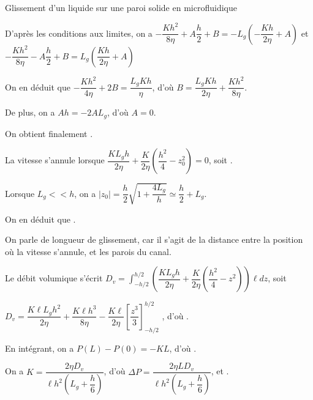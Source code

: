 \begin{exo}[PC][1][devoir]{Glissement d'un liquide sur une paroi solide en microfluidique}
\begin{quest}
{  D'après les conditions aux limites, on a $-\dfrac{Kh^2}{8\eta}+A\dfrac{h}{2}+B=-L_g\left(-\dfrac{Kh}{2\eta}+A\right)$ et $-\dfrac{Kh^2}{8\eta}-A\dfrac{h}{2}+B=L_g\left(\dfrac{Kh}{2\eta}+A\right)$

On en déduit que $-\dfrac{Kh^2}{4\eta}+2B=\dfrac{L_gKh}{\eta}$, d'où $B=\dfrac{L_gKh}{2\eta}+\dfrac{Kh^2}{8\eta}$.

De plus, on a $Ah=-2AL_g$, d'où $A=0$.

On obtient finalement 
.

}

{
  La vitesse s'annule lorsque $\dfrac{KL_gh}{2\eta}+\dfrac{K}{2\eta}\left(\dfrac{h^2}{4}-z_0^2\right)=0$, soit .

Lorsque $L_g<<h$, on a $\vert z_0 \vert =\dfrac{h}{2}\sqrt{1+\dfrac{4L_g}{h}}\simeq \dfrac{h}{2}+L_g$.

On en déduit que 
.

On parle de longueur de glissement, car il s'agit de la distance entre la position où la vitesse s'annule, et les parois du canal.
}

{
  Le débit volumique s'écrit $D_v=\displaystyle\int_{-h/2}^{h/2}\left(\dfrac{KL_gh}{2\eta}+\dfrac{K}{2\eta}\left(\dfrac{h^2}{4}-z^2\right)\right)\ell dz$, soit 

$D_v=\dfrac{K\ell L_gh^2}{2\eta}+\dfrac{K\ell h^3}{8\eta}-\dfrac{K\ell}{2\eta}\left[\dfrac{z^3}{3}\right]_{-h/2}^{h/2}$ , d'où .
}

{
  En intégrant, on a $P(L)-P(0)=-KL$, d'où .
}

{
  On a $K=\dfrac{2\eta D_v}{\ell h^2\left(L_g+\dfrac{h}{6}\right)}$, d'où $\Delta P=\dfrac{2\eta L D_v}{\ell h^2\left(L_g+\dfrac{h}{6}\right)}$, et .

}
\end{quest}
\end{exo}
